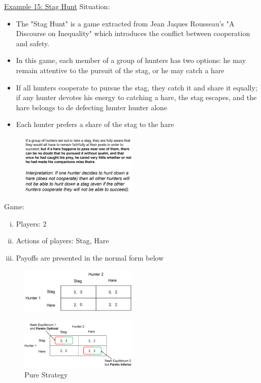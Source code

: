 \underline{Example 15: Stag Hunt}
Situation:
\begin{itemize}
    \item The "Stag Hunt" is a game extracted from Jean Jaques Rousseau's
        "A Discourse on Inequality" which introduces the conflict between
        cooperation and safety.
    \item In this game, each member of a group of hunters has two options:
        he may remain attentive to the pursuit of the stag, or he may catch a hare
    \item If all hunters cooperate to pursue the stag, they catch it and share it
        equally; if any hunter devotes his energy to catching a hare, the stag
        escapes, and the hare belongs to de defecting hunter hunter alone
    \item Each hunter prefers a share of the stag to the hare
\end{itemize}


\begin{figure}[H]
    \centering
    \includegraphics[width=0.5\textwidth]{Pictures/rousseau.png}
\end{figure}

Game:
\begin{enumerate}[(i)]
    \item Players: 2
    \item Actions of players: Stag, Hare
    \item Payoffs are presented in the normal form below
\end{enumerate}

\begin{figure}[H]
    \centering
    \includegraphics[width=0.5\textwidth]{Pictures/stag_hare_hunter.png}
\end{figure}

\begin{figure}[H]
    \centering
    \includegraphics[width=0.5\textwidth]{Pictures/hunter_pure_strategy.png}
    \caption{Pure Strategy}
\end{figure}

